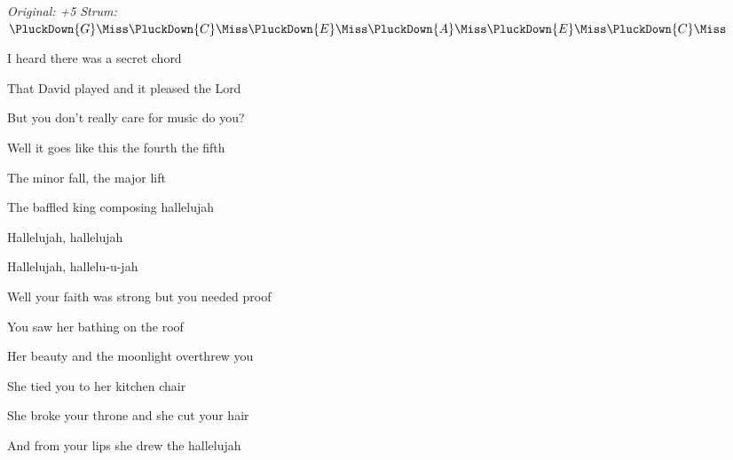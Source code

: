 \begin{song}


\begin{headerbox}
\RaiseBoxWithChucks
{} \quad
\textit{Original: +5} \quad
\textit{Strum:} $\PluckDown{G}\Miss\PluckDown{C}\Miss\PluckDown{E}\Miss\PluckDown{A}\Miss\PluckDown{E}\Miss\PluckDown{C}\Miss$
\end{headerbox}

\begin{vchordbox}
\end{vchordbox}

\Large

\bigskip

I heard there was a secret chord \par
That David played and it pleased the Lord \par
But you don't really care for music do you?  \par
Well it goes like this the fourth the fifth \par
The minor fall, the major lift \par
The baffled king composing hallelujah \par

\bigskip

\begin{chorusbox}{\Chorus}
Hallelujah, hallelujah \par
Hallelujah, hallelu-u-jah    \par
\end{chorusbox}

\bigskip

Well your faith was strong but you needed proof \par
You saw her bathing on the roof \par
Her beauty and the moonlight overthrew you  \par
She tied you to her kitchen chair \par
She broke your throne and she cut your hair \par
And from your lips she drew the hallelujah \par


\end{song}
